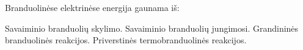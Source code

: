 \question Branduolinėse elektrinėse energija gaunama iš: \begin{choices}
    \choice Savaiminio branduolių skylimo.
    \choice Savaiminio branduolių jungimosi.
    \choice Grandininės branduolinės reakcijos.
    \choice Priverstinės termobranduolinės reakcijos.
\end{choices}